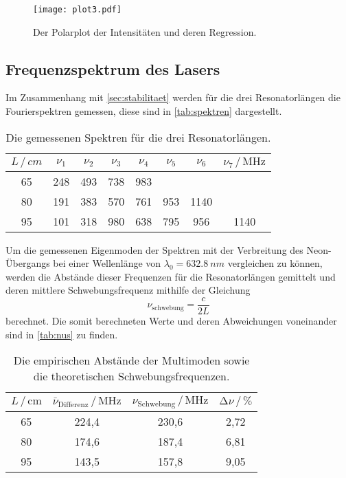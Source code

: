 \begin{figure}[H]
    \centering
    \texttt{[image: plot3.pdf]}
    \caption{Der Polarplot der Intensitäten und deren Regression.}
    \label{fig:plot3}
\end{figure}


\subsection{Frequenzspektrum des Lasers} \label{sec:spektrum}
Im Zusammenhang mit \autoref{sec:stabilitaet} werden für die drei Resonatorlängen die Fourierspektren gemessen,
diese sind in \autoref{tab:spektren} dargestellt.
\begin{table}
    \centering
    \caption{Die gemessenen Spektren für die drei Resonatorlängen.}
    \label{tab:spektren}
    \begin{tabular}{c c c c c c c c}
        \toprule
        $L \, / \, cm$ & $\nu_1$ & $\nu_2$ & $\nu_3$ & $\nu_4$ & $\nu_5$ & $\nu_6$ & $\nu_7  \, / \, \unit{\mega\hertz}$\\
        \midrule
           65 &  248 &  493 &  738 &  983 &       &        &        \\
           80 &  191 &  383 &  570 &  761 & 953 & 1140 &        \\
           95 &  101 &  318 &  980 &  638 & 795 &  956 & 1140 \\
        \bottomrule
    \end{tabular}
\end{table}

Um die gemessenen Eigenmoden der Spektren mit der Verbreitung des Neon-Übergangs
bei einer Wellenlänge von $\lambda_0 = \qty{632.8}{nm}$ vergleichen zu können,
werden die Abstände dieser Frequenzen für die Resonatorlängen gemittelt
und deren mittlere Schwebungsfrequenz mithilfe der Gleichung
\begin{equation*}
    \nu_{\text{schwebung}} = \frac{c}{2L} 
\end{equation*}
berechnet. 
Die somit berechneten Werte und deren Abweichungen voneinander sind in \autoref{tab:nus} zu finden.
\begin{table}
    \centering
    \caption{Die empirischen Abstände der Multimoden sowie die theoretischen Schwebungsfrequenzen.}
    \label{tab:nus}
    \begin{tabular}{c c c c}
        \toprule
        $L \, / \, \mathrm{cm}$ & 
        $\bar{\nu}_\text{Differenz} \, / \, \unit{\mega\hertz}$ & 
        $\nu_{\text{Schwebung}} \, / \, \unit{\mega\hertz}$ &
        $\increment \nu  \, / \, \unit{\percent}$ \\
        \midrule
           65 & 224,4 &  230,6 & 2,72 \\
           80 & 174,6 &  187,4 & 6,81 \\ 
           95 & 143,5 &  157,8 & 9,05 \\
        \bottomrule
    \end{tabular}
\end{table}

